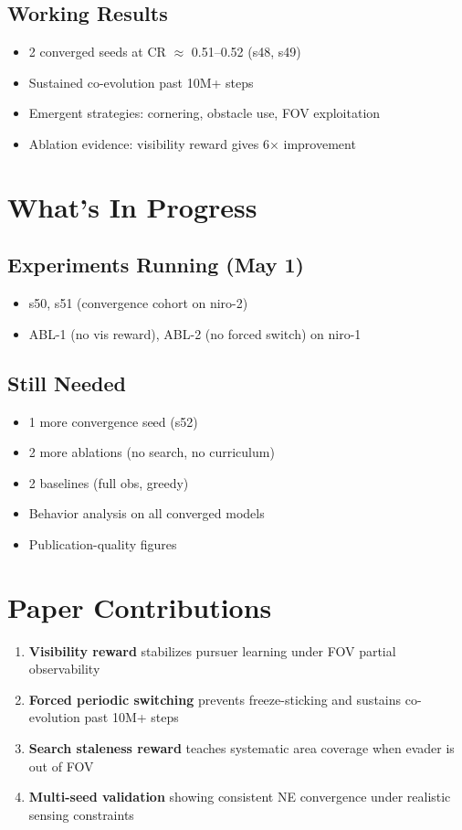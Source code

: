 \documentclass[11pt,a4paper]{report}
\begin{document}
\subsection{Working Results}
\begin{itemize}
    \item 2 converged seeds at CR $\approx$ 0.51--0.52 (s48, s49)
    \item Sustained co-evolution past 10M+ steps
    \item Emergent strategies: cornering, obstacle use, FOV exploitation
    \item Ablation evidence: visibility reward gives 6$\times$ improvement
\end{itemize}

\section{What's In Progress}

\subsection{Experiments Running (May 1)}
\begin{itemize}
    \item s50, s51 (convergence cohort on niro-2)
    \item ABL-1 (no vis reward), ABL-2 (no forced switch) on niro-1
\end{itemize}

\subsection{Still Needed}
\begin{itemize}
    \item 1 more convergence seed (s52)
    \item 2 more ablations (no search, no curriculum)
    \item 2 baselines (full obs, greedy)
    \item Behavior analysis on all converged models
    \item Publication-quality figures
\end{itemize}

\section{Paper Contributions}

\begin{enumerate}
    \item \textbf{Visibility reward} stabilizes pursuer learning under FOV partial observability
    \item \textbf{Forced periodic switching} prevents freeze-sticking and sustains co-evolution past 10M+ steps
    \item \textbf{Search staleness reward} teaches systematic area coverage when evader is out of FOV
    \item \textbf{Multi-seed validation} showing consistent NE convergence under realistic sensing constraints
\end{enumerate}
\end{document}
